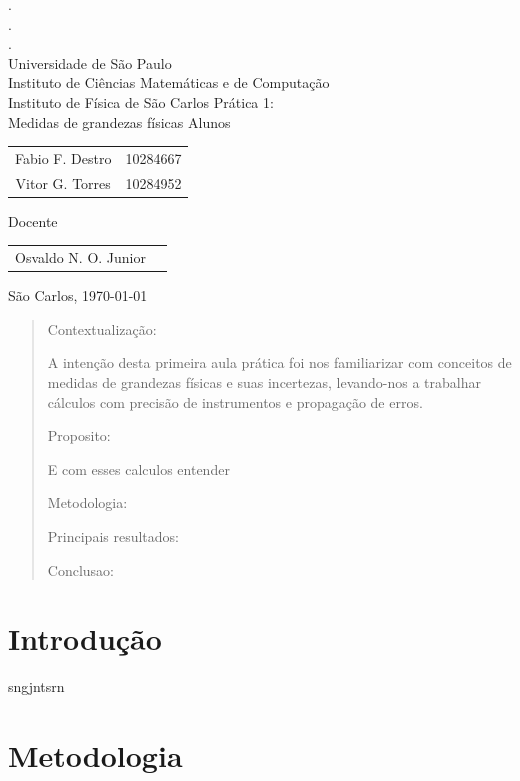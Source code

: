 \documentclass{article}
\begin{document}
\begin{titlepage}
\centering
{\Large
{\color{white}.\\.\\.} \\
Universidade de São Paulo\\
Instituto de Ciências Matemáticas e de Computação\\\vspace{1.8mm}
Instituto de Física de São Carlos}
\vfill
Prática 1:\\
{\Large
Medidas de grandezas físicas}
\vfill
Alunos
\begin{tabular}{c c}
    Fabio F. Destro & 10284667\\
    Vitor G. Torres & 10284952
\end{tabular}
\vfill
Docente
\begin{tabular}{c c}
    Osvaldo N. O. Junior
\end{tabular}
\vfill
São Carlos, \today\\
\end{titlepage}
\newpage


\begin{abstract}
\indent
Contextualização:

A intenção desta primeira aula prática foi nos familiarizar com conceitos de medidas de grandezas físicas e suas incertezas, levando-nos a trabalhar cálculos com precisão de instrumentos e propagação de erros.

Proposito:

E com esses calculos entender 

Metodologia:



Principais resultados:



Conclusao:



\end{abstract}
\newpage

\section{Introdução}
\indent
sngjntsrn
\section{Metodologia}
\end{document}
